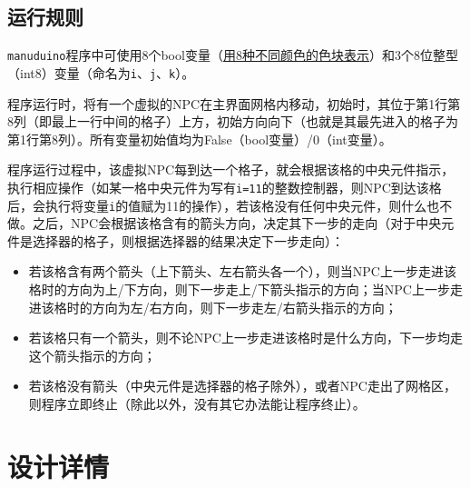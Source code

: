 \documentclass[UTF8]{ctexart}
\begin{document}
\subsection{运行规则}
\texttt{manuduino}程序中可使用8个bool变量（\uline{用8种不同颜色的色块表示}）和3个8位整型（int8）变量（命名为\texttt{i}、\texttt{j}、\texttt{k}）。\par
程序运行时，将有一个虚拟的NPC在主界面网格内移动，初始时，其位于第1行第8列（即最上一行中间的格子）上方，初始方向向下（也就是其最先进入的格子为第1行第8列）。所有变量初始值均为False（bool变量）/0（int变量）。\par
程序运行过程中，该虚拟NPC每到达一个格子，就会根据该格的中央元件指示，执行相应操作（如某一格中央元件为写有\texttt{i=11}的整数控制器，则NPC到达该格后，会执行将变量\texttt{i}的值赋为11的操作），若该格没有任何中央元件，则什么也不做。之后，NPC会根据该格含有的箭头方向，决定其下一步的走向（对于中央元件是选择器的格子，则根据选择器的结果决定下一步走向）：
\begin{itemize}
    \item 若该格含有两个箭头（上下箭头、左右箭头各一个），则当NPC上一步走进该格时的方向为上/下方向，则下一步走上/下箭头指示的方向；当NPC上一步走进该格时的方向为左/右方向，则下一步走左/右箭头指示的方向；
    \item 若该格只有一个箭头，则不论NPC上一步走进该格时是什么方向，下一步均走这个箭头指示的方向；
    \item 若该格没有箭头（中央元件是选择器的格子除外），或者NPC走出了网格区，则程序立即终止（除此以外，没有其它办法能让程序终止）。
\end{itemize}

\section{设计详情}
\end{document}
